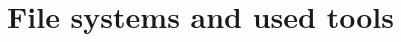 \documentclass[
  color, %
  table, %
  lof,   %
  lot,   %
]{fithesis3}
\begin{document}







\chapter{File systems and used tools}
\end{document}
